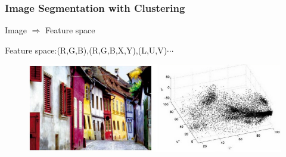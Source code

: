 \documentclass[notheorems,serif,table,compress]{beamer}  %
\begin{document}
\begin{frame}
\frametitle{Image Segmentation with Clustering}
   \centering \qquad \quad Image \quad $\Longrightarrow$ \quad Feature space\newline

\pause
{\color{blue}Feature space:}(R,G,B),(R,G,B,X,Y),(L,U,V)$\cdots$
    \begin{figure}
      \includegraphics[width=0.8\linewidth]{clustering.png}
    \end{figure}
\end{frame}
 
\end{document}
